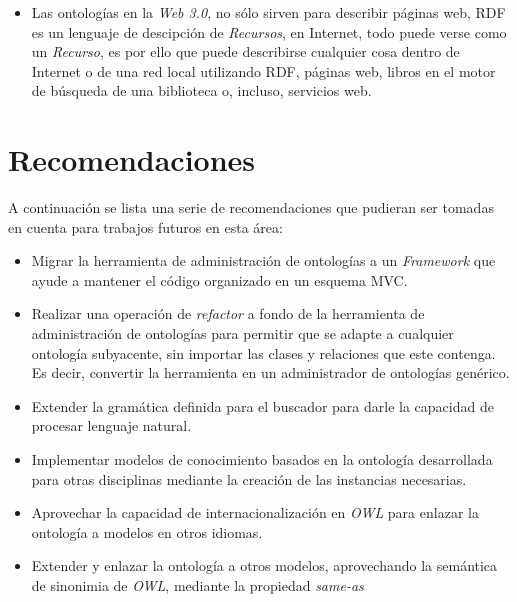 \begin{itemize}
    \item Las ontologías en la \textit{Web 3.0}, no sólo sirven para describir páginas web, RDF es un lenguaje de descipción de \textit{Recursos}, en Internet, todo puede verse como un \textit{Recurso}, es por ello que puede describirse cualquier cosa dentro de Internet o de una red local utilizando RDF, páginas web, libros en el motor de búsqueda de una biblioteca o, incluso, servicios web.
\end{itemize}

\section{Recomendaciones}
A continuación se lista una serie de recomendaciones que pudieran ser tomadas en cuenta para trabajos futuros en esta área:

\begin{itemize}
    \item Migrar la herramienta de administración de ontologías a un \textit{Framework} que ayude a mantener el código organizado en un esquema MVC.
    \item Realizar una operación de \textit{refactor} a fondo de la herramienta de administración de ontologías para permitir que se adapte a cualquier ontología subyacente, sin importar las clases y relaciones que este contenga. Es decir, convertir la herramienta en un administrador de ontologías genérico.
    \item Extender la gramática definida para el buscador para darle la capacidad de procesar lenguaje natural.
    \item Implementar modelos de conocimiento basados en la ontología desarrollada para otras disciplinas mediante la creación de las instancias necesarias.
    \item Aprovechar la capacidad de internacionalización en \textit{OWL} para enlazar la ontología a modelos en otros idiomas.
    \item Extender y enlazar la ontología a otros modelos, aprovechando la semántica de sinonimia de \textit{OWL}, mediante la propiedad \textit{same-as}
\end{itemize}
